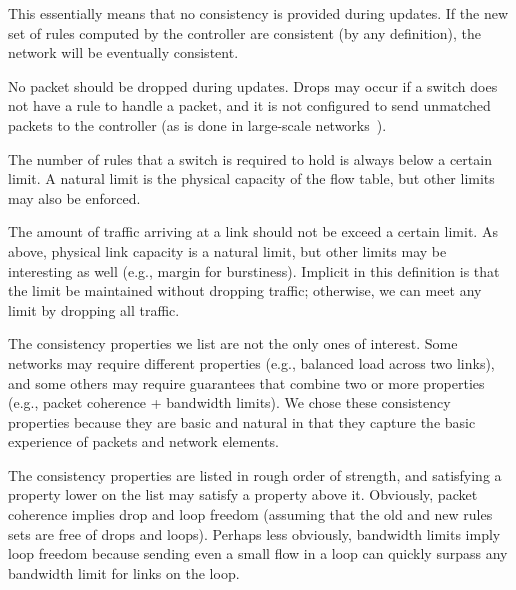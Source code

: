  This essentially means that no consistency is provided during updates. If the new set of rules computed by the controller are consistent (by any definition), the network will be eventually consistent.

 No packet should be dropped during updates. Drops may occur if a switch does not have a rule to handle a packet, and it is not configured to send unmatched packets to the controller (as is done in large-scale networks~\cite{swan,b4}).



 The number of rules that a switch is required to hold is always below a certain limit. A natural limit is the physical capacity of the flow table, but other limits may also be enforced.

 The amount of traffic arriving at a link should not be exceed a certain limit. As above, physical link capacity is a natural limit, but other limits may be interesting as well (e.g., margin for burstiness). Implicit in this definition is that the limit be maintained without dropping traffic; otherwise, we can meet any limit by dropping all traffic.

The consistency properties we list are not the only ones of interest. 
Some networks may require different properties (e.g., balanced load across two links), and some others may require  guarantees that combine two or more properties (e.g., packet coherence + bandwidth limits). We chose these consistency properties because they are basic and natural in that they capture the basic experience of packets and network elements.

The consistency properties are listed in rough order of strength, and satisfying a property lower on the list may satisfy a property above it. Obviously, packet coherence implies drop and loop freedom (assuming that the old and new rules sets are free of drops and loops). Perhaps less obviously, bandwidth limits imply loop freedom because sending even a small flow in a loop can quickly surpass any bandwidth limit for links on the loop.  

